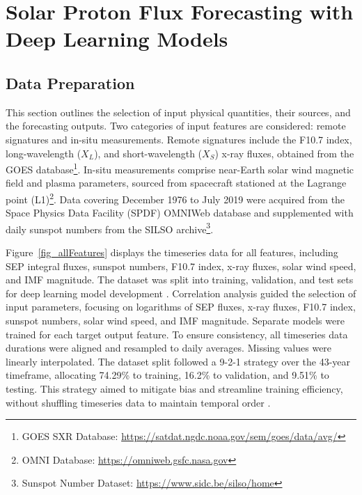 \section{Solar Proton Flux Forecasting with Deep Learning Models}
\subsection{Data Preparation}
This section outlines the selection of input physical quantities, their sources, and the forecasting outputs. Two categories of input features are considered: remote signatures and in-situ measurements. Remote signatures include the F10.7 index, long-wavelength ($X_L$), and short-wavelength ($X_S$) x-ray fluxes, obtained from the GOES database\footnote{GOES SXR Database: \url{https://satdat.ngdc.noaa.gov/sem/goes/data/avg/}}. In-situ measurements comprise near-Earth solar wind magnetic field and plasma parameters, sourced from spacecraft stationed at the Lagrange point (L1)\footnote{OMNI Database: \url{https://omniweb.gsfc.nasa.gov}}. Data covering December 1976 to July 2019 were acquired from the Space Physics Data Facility (SPDF) OMNIWeb database and supplemented with daily sunspot numbers from the SILSO archive\footnote{Sunspot Number Dataset: \url{https://www.sidc.be/silso/home}}.

Figure~\ref{fig_allFeatures} displays the timeseries data for all features, including SEP integral fluxes, sunspot numbers, F10.7 index, x-ray fluxes, solar wind speed, and IMF magnitude. The dataset was split into training, validation, and test sets for deep learning model development \citep{ripley_2007}. Correlation analysis guided the selection of input parameters, focusing on logarithms of SEP fluxes, x-ray fluxes, F10.7 index, sunspot numbers, solar wind speed, and IMF magnitude. Separate models were trained for each target output feature.
To ensure consistency, all timeseries data durations were aligned and resampled to daily averages. Missing values were linearly interpolated. The dataset split followed a 9-2-1 strategy over the 43-year timeframe, allocating 74.29\% to training, 16.2\% to validation, and 9.51\% to testing. This strategy aimed to mitigate bias and streamline training efficiency, without shuffling timeseries data to maintain temporal order \citep{mnedal_2019, pala_2019, benson_2020, zhang_lstm_2022, zhu_2022}.

